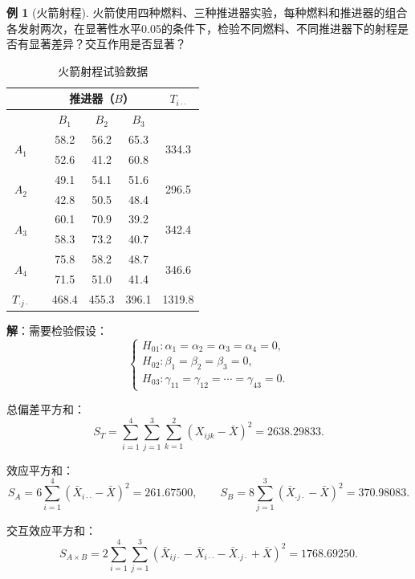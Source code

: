 \documentclass[11pt,a4paper]{report}
\theoremstyle{definition}
\newtheorem{example}{例}[chapter]
\begin{document}
\begin{example}[火箭射程]
火箭使用四种燃料、三种推进器实验，每种燃料和推进器的组合各发射两次，在显著性水平0.05的条件下，检验不同燃料、不同推进器下的射程是否有显著差异？交互作用是否显著？

\begin{table}[htbp]
\centering
\caption{火箭射程试验数据}
\begin{tabular}{@{}cccccc@{}}
\toprule
 & & \multicolumn{3}{c}{推进器（$B$）} & $T_{i\cdot\cdot}$ \\
\midrule
 & & $B_{1}$ & $B_{2}$ & $B_{3}$ & \\
\multirow{2}{*}{$A_{1}$} & & 58.2 & 56.2 & 65.3 & \multirow{2}{*}{334.3} \\
 & & 52.6 & 41.2 & 60.8 & \\
\multirow{2}{*}{$A_{2}$} & & 49.1 & 54.1 & 51.6 & \multirow{2}{*}{296.5} \\
 & & 42.8 & 50.5 & 48.4 & \\
\multirow{2}{*}{$A_{3}$} & & 60.1 & 70.9 & 39.2 & \multirow{2}{*}{342.4} \\
 & & 58.3 & 73.2 & 40.7 & \\
\multirow{2}{*}{$A_{4}$} & & 75.8 & 58.2 & 48.7 & \multirow{2}{*}{346.6} \\
 & & 71.5 & 51.0 & 41.4 & \\
\midrule
$T_{\cdot j\cdot}$ & & 468.4 & 455.3 & 396.1 & 1319.8 \\
\bottomrule
\end{tabular}
\end{table}

\textbf{解}：需要检验假设：
\[
\begin{cases}
H_{01}\colon\alpha_{1}=\alpha_{2}=\alpha_{3}=\alpha_{4}=0,\\[0.3em]
H_{02}\colon\beta_{1}=\beta_{2}=\beta_{3}=0,\\[0.3em]
H_{03}\colon\gamma_{11}=\gamma_{12}=\cdots=\gamma_{43}=0.
\end{cases}
\]

总偏差平方和：
\[
S_{T}=\sum_{i=1}^{4}\sum_{j=1}^{3}\sum_{k=1}^{2}(X_{ijk}-\bar{X})^{2}=2638.29833.
\]

效应平方和：
\[
S_{A}=6\sum_{i=1}^{4}(\bar{X}_{i\cdot\cdot}-\bar{X})^{2}=261.67500,\qquad
S_{B}=8\sum_{j=1}^{3}(\bar{X}_{\cdot j\cdot}-\bar{X})^{2}=370.98083.
\]

交互效应平方和：
\[
S_{A\times B}=2\sum_{i=1}^{4}\sum_{j=1}^{3}(\bar{X}_{ij\cdot}-\bar{X}_{i\cdot\cdot}-\bar{X}_{\cdot j\cdot}+\bar{X})^{2}=1768.69250.
\]


\end{example}
\end{document}
